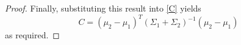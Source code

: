 \documentclass[12pt,leqno]{article}
\begin{document}
\begin{proof}
Finally, substituting this result into \eqref{C} yields
\begin{equation}\label{C:1}
  C = (\mu_2-\mu_1)^T(\Sigma_1+\Sigma_2)^{-1}(\mu_2-\mu_1)
\end{equation}
as required.
\end{proof}
\end{document}
